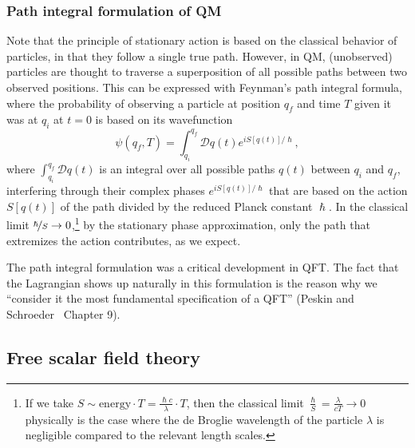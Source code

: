 \subsubsection{Path integral formulation of QM}
\label{sec:01_qft_classical_path_integral}

Note that the principle of stationary action is based on the classical behavior of particles, in that they follow a single true path.
However, in QM, (unobserved) particles are thought to traverse a superposition of all possible paths between two observed positions.
This can be expressed with Feynman's path integral formula, where the probability of observing a particle at position $q_f$ and time $T$ given it was at $q_i$ at $t = 0$ is based on its wavefunction
\begin{equation}
	\label{eq:01_qft_lagrangian_path_integral}
	\psi(q_f, T) = \int_{q_i}^{q_f} \mathcal{D}q(t) e^{iS[q(t)]/\hslash},
\end{equation}
where $\int_{q_i}^{q_f}\mathcal{D}q(t)$ is an integral over all possible paths $q(t)$ between $q_i$ and $q_f$, interfering through their complex phases $e^{iS[q(t)]/\hslash}$ that are based on the action $S[q(t)]$ of the path divided by the reduced Planck constant $\hslash$.
In the classical limit $\cnicefrac{\hslash}{S} \rightarrow 0$,\footnote{If we take $S \sim \mathrm{energy} \cdot T = \frac{\hslash c}{\lambda}\cdot T$, then the classical limit $\frac{\hslash}{S} = \frac{\lambda}{cT} \rightarrow 0$ physically is the case where the de Broglie wavelength of the particle $\lambda$ is negligible compared to the relevant length scales.} by the stationary phase approximation, only the path that extremizes the action contributes, as we expect.

The path integral formulation was a critical development in QFT.
The fact that the Lagrangian shows up naturally in this formulation is the reason why we ``consider it the most fundamental specification of a QFT'' (Peskin and Schroeder~\cite{Peskin:1995ev} Chapter 9).

\subsection{Free scalar field theory}
\label{sec:01_qft_classical_fsft}

